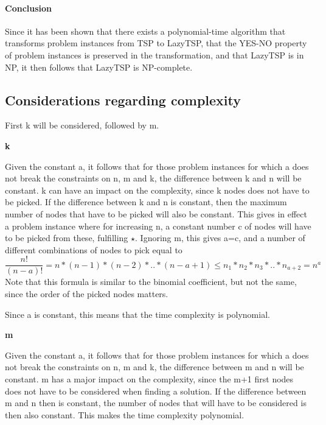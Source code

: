 \paragraph{Conclusion}

Since it has been shown that there exists a polynomial-time algorithm
that transforms problem instances from TSP to LazyTSP, that the
YES-NO property of problem instances is preserved in the transformation,
and that LazyTSP is in NP, it then follows that LazyTSP is NP-complete.

\subsection{Considerations regarding complexity}

First k will be considered, followed by m.

\textbf{k}

Given the constant a, it follows that for those problem instances
for which a does not break the constraints on n, m and k, the difference
between k and n will be constant. k can have an impact on the complexity,
since k nodes does not have to be picked. If the difference between k and n
is constant, then the maximum number of nodes that have to be picked will
also be constant. This gives in effect a problem instance where for increasing n,
a constant number c of nodes will have to be picked from these, fulfilling \(\star\).
Ignoring m, this gives a=c, and a number of different combinations of nodes to pick equal to
\[\frac{n!}{(n-a)!} = n * (n-1) * (n-2) * .. * (n-a+1) \leq n_1 * n_2 * n_3 * .. * n_{a + 2} = n^{a}\]
Note that this formula is similar to the binomial coefficient, but not the same,
since the order of the picked nodes matters.

Since a is constant, this means that the time complexity is polynomial.

\textbf{m}

Given the constant a, it follows that for those problem instances
for which a does not break the constraints on n, m and k, the difference
between m and n will be constant. m has a major impact on the complexity,
since the m+1 first nodes does not have to be considered when finding a solution.
If the difference between m and n then is constant, the number of nodes that will
have to be considered is then also constant. This makes the time complexity polynomial.


